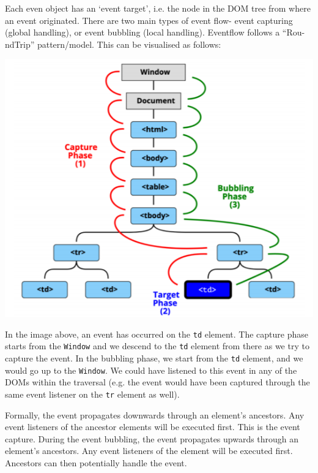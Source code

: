 \documentclass[a4paper, openany]{memoir}
\begin{document}
Each even object has an `event target', i.e. the node in the DOM tree from where an event originated. There are two main types of event flow- event capturing (global handling), or event bubbling (local handling). Eventflow follows a ``Rou-ndTrip'' pattern/model. This can be visualised as follows:
\begin{center}
    \includegraphics[scale=0.8]{src/L12I3.PNG}
\end{center}
In the image above, an event has occurred on the \texttt{td} element. The capture phase starts from the \texttt{Window} and we descend to the \texttt{td} element from there as we try to capture the event. In the bubbling phase, we start from the \texttt{td} element, and we would go up to the \texttt{Window}. We could have listened to this event in any of the DOMs within the traversal (e.g. the event would have been captured through the same event listener on the \texttt{tr} element as well).

Formally, the event propagates downwards through an element's ancestors. Any event listeners of the ancestor elements will be executed first. This is the event capture. During the event bubbling, the event propagates upwards through an element's ancestors. Any event listeners of the element will be executed first. Ancestors can then potentially handle the event.
\end{document}
